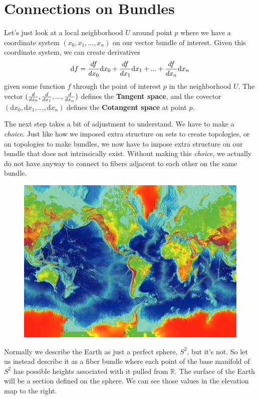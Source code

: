 \section{Connections on Bundles}
Let's just look at a local neighborhood $U$ around point $p$ where we have a coordinate system $(x_0, x_1, ..., x_n)$ on our vector bundle of interest.  Given this coordinate system, we can create derivatives
\begin{equation}
  \text{d}f = \frac{d f}{d x_0} \text{d}x_0 + \frac{d f}{d x_1} \text{d}x_1 + ... + \frac{d f}{d x_n} \text{d}x_n
\end{equation}
given some function $f$ through the point of interest $p$ in the neighborhood $U$. The vector $(\frac{d }{d x_0}, \frac{d }{d x_1},...,\frac{d }{d x_n}) $ defines the \textbf{Tangent space}, and the covector $(\text{d} x_0, \text{d}x_1, ..., \text{d} x_n)$ defines the \textbf{Cotangent space} at point $p$.

The next step takes a bit of adjustment to understand.  We have to make a \textit{choice}.  Just like how we imposed extra structure on sets to create topologies, or on topologies to make bundles, we now have to impose extra structure on our bundle that does not intrinsically exist.  Without making this \textit{choice}, we actually do not have anyway to connect to fibers adjacent to each other on the same bundle.

  \begin{figure}\begin{center}
    \includegraphics[width=.35\textwidth]{pics/earth_surface.jpg}\end{center}
    \caption{ \protect\footnotemark }
  \end{figure}

  Normally we describe the Earth as just a perfect sphere, $S^2$, but it's not.  So let us instead describe it as a fiber bundle where each point of the base manifold of $S^2$ has possible heights associated with it pulled from $\mathbb{R}$.  The surface of the Earth will be a section defined on the sphere. We can see those values in the elevation map to the right.


